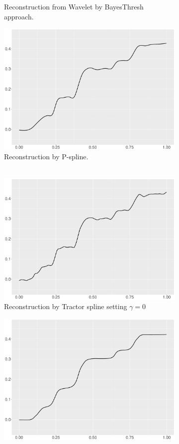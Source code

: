 \begin{figure}
\begin{subfigure}{0.45\textwidth}
    \caption{Reconstruction from Wavelet by BayesThresh approach.}
    \end{subfigure}
    \begin{subfigure}{0.45\textwidth}
    \centering
    \includegraphics[width=\linewidth,height=0.45\textwidth]{Chapters/02TractorSplineTheory/plot/ggplot/ggBumpsPSpline.pdf}
    \caption{Reconstruction by P-spline. \\\mbox{  } }
    \end{subfigure}
    \begin{subfigure}{0.45\textwidth}
    \centering
    \includegraphics[width=\linewidth,height=0.45\textwidth]{Chapters/02TractorSplineTheory/plot/ggplot/ggBumpsGamma.pdf}
    \caption{Reconstruction by Tractor spline setting $\gamma=0$}
    \end{subfigure}
  \begin{subfigure}{0.45\textwidth}
    \centering
    \includegraphics[width=\linewidth,height=0.45\textwidth]{Chapters/02TractorSplineTheory/plot/ggplot/ggBumpsTractorAPT.pdf}

\end{subfigure}
\end{figure}
